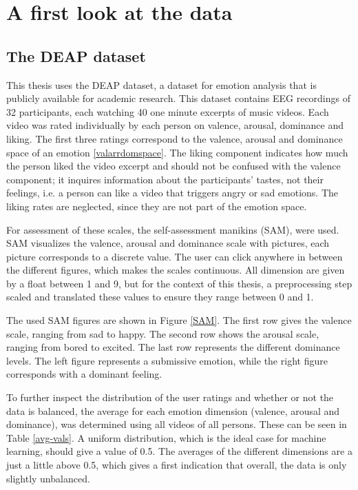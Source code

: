 \chapter{A first look at the data}
{\samenvatting }

\section{The DEAP dataset}
This thesis uses the DEAP dataset\cite{DEAP}, a dataset for emotion analysis that is publicly available for academic research. This dataset contains EEG recordings of 32 participants, each watching 40 one minute excerpts of music videos. Each video was rated individually by each person on valence, arousal, dominance and liking. The first three ratings correspond to the valence, arousal and dominance space of an emotion \ref{valarrdomspace}. The liking component indicates how much the person liked the video excerpt and should not be confused with the valence component; it inquires information about the participants' tastes, not their feelings, i.e. a person can like a video that triggers angry or sad emotions. The liking rates are neglected, since they are not part of the emotion space.

\npar

For assessment of these scales, the self-assessment manikins (SAM), were used\cite{DEAP}. SAM visualizes the valence, arousal and dominance scale with pictures, each picture corresponds to a discrete value. The user can click anywhere in between the different figures, which makes the scales continuous. All dimension are given by a float between 1 and 9, but for the context of this thesis, a preprocessing step scaled and translated these values to ensure they range between 0 and 1.

\npar

The used SAM figures are shown in Figure \ref{SAM}. The first row gives the valence scale, ranging from sad to happy. The second row shows the arousal scale, ranging from bored to excited. The last row represents the different dominance levels. The left figure represents a submissive emotion, while the right figure corresponds with a dominant feeling.


To further inspect the distribution of the user ratings and whether or not the data is balanced, the average for each emotion dimension (valence, arousal and dominance), was determined using all videos of all persons. These can be seen in Table \ref{avg-vals}. A uniform distribution, which is the ideal case for machine learning, should give a value of 0.5. The averages of the different dimensions are a just a little above 0.5, which gives a first indication that overall, the data is only slightly unbalanced.

